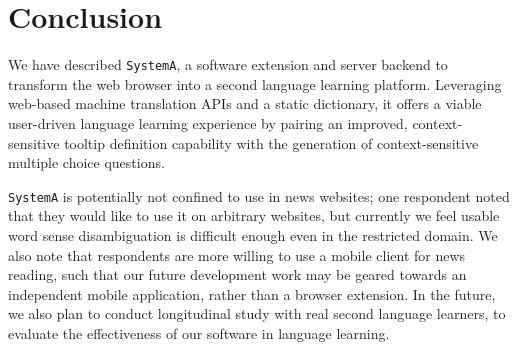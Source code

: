 \section{Conclusion}
\label{sec:conclusion}

We have described {\tt SystemA}, a software extension and server
backend to transform the web browser into a second language learning
platform.  Leveraging web-based machine translation APIs and a static
dictionary, it offers a viable user-driven language learning
experience by pairing an improved, context-sensitive tooltip
definition capability with the generation of context-sensitive
multiple choice questions.


{\tt SystemA} is potentially not confined to use in news websites; one
respondent noted that they would like to use it on arbitrary websites,
but currently we feel usable word sense disambiguation is difficult
enough even in the restricted domain.  We also note that respondents
are more willing to use a mobile client for news reading, such that
our future development work may be geared towards an independent
mobile application, rather than a browser extension. In the future, we also plan to conduct longitudinal study with real second language learners, to evaluate the effectiveness of our software in language learning.

